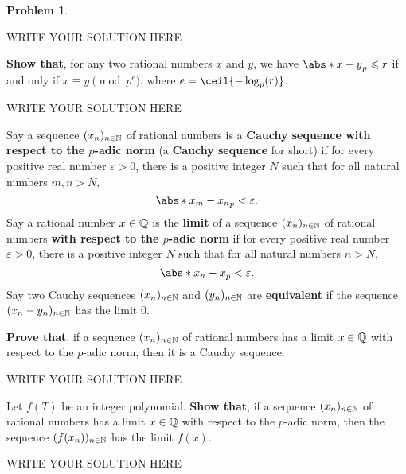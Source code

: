 \documentclass[11pt]{article}
\theoremstyle{plain}
\theoremstyle{definition}
\newtheorem{problem}{Problem}
\theoremstyle{remark}
\numberwithin{equation}{problem}
\begin{document}
\begin{problem}
\begin{listinprob}[resume]
\begin{solution} %
WRITE YOUR SOLUTION HERE
\end{solution}\clearpage %
		\item \label{p1.p-adic_to_congruence} \textbf{Show that}, for any two rational numbers $x$ and $y$, we have $\abs*{x-y}_{p}\le r$ if and only if $x\equiv y\pmod{p^e}$, where $e=\ceil{-\log_p(r)}$.
\begin{solution} %
WRITE YOUR SOLUTION HERE
\end{solution}\clearpage %
  \end{listinprob}
	Say a sequence $(x_n)_{n\in\mathbb{N}}$ of rational numbers is a \textbf{Cauchy sequence with respect to the $p$-adic norm} (a \textbf{Cauchy sequence} for short) if for every positive real number $\varepsilon>0$, there is a positive integer $N$ such that for all natural numbers $m,n>N$,  
	\[
		\abs*{x_m-x_n}_p<\varepsilon.
	\]
	Say a rational number $x\in\mathbb{Q}$ is the \textbf{limit} of a sequence $(x_n)_{n\in\mathbb{N}}$ of rational numbers \textbf{with respect to the $p$-adic norm} if for every positive real number $\varepsilon>0$, there is a positive integer $N$ such that for all natural numbers $n>N$,  
	\[
		\abs*{x_n-x}_p<\varepsilon.
	\]
	Say two Cauchy sequences $(x_n)_{n\in\mathbb{N}}$ and $(y_n)_{n\in\mathbb{N}}$ are \textbf{equivalent} if the sequence $(x_n-y_n)_{n\in\mathbb{N}}$ has the limit $0$.
	\begin{listinprob}[resume]
		\item \textbf{Prove that}, if a sequence $(x_n)_{n\in\mathbb{N}}$ of rational numbers has a limit $x\in\mathbb{Q}$ with respect to the $p$-adic norm, then it is a Cauchy sequence.
\begin{solution} %
WRITE YOUR SOLUTION HERE
\end{solution}\clearpage %
		\item Let $f(T)$ be an integer polynomial. \textbf{Show that}, if a sequence $(x_n)_{n\in\mathbb{N}}$ of rational numbers has a limit $x\in\mathbb{Q}$ with respect to the $p$-adic norm, then the sequence $(f(x_n))_{n\in\mathbb{N}}$ has the limit $f(x)$.
\begin{solution} %
WRITE YOUR SOLUTION HERE
\end{solution}\clearpage %

\end{listinprob}
\end{problem}
\end{document}
